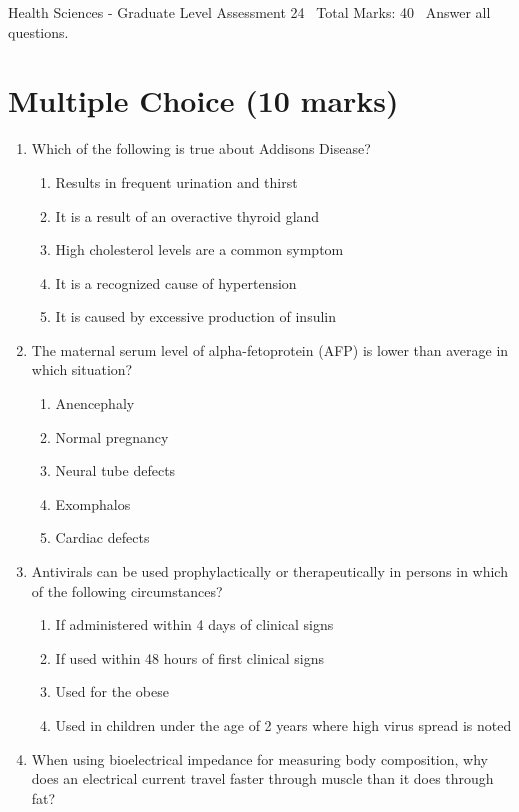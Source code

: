 \documentclass[12pt]{article}
\begin{document}
\begin{center}
Health Sciences - Graduate Level Assessment 24 \
Total Marks: 40 \
Answer all questions.
\end{center}

\section*{Multiple Choice (10 marks)}
\begin{enumerate}[label=\arabic*.]
\item Which of the following is true about Addisons Disease?
\begin{enumerate}[label=(\alph*)]
    \item Results in frequent urination and thirst
    \item It is a result of an overactive thyroid gland
    \item High cholesterol levels are a common symptom
    \item It is a recognized cause of hypertension
    \item It is caused by excessive production of insulin
\end{enumerate}
\item The maternal serum level of alpha-fetoprotein (AFP) is lower than average in which situation?
\begin{enumerate}[label=(\alph*)]
    \item Anencephaly
    \item Normal pregnancy
    \item Neural tube defects
    \item Exomphalos
    \item Cardiac defects
\end{enumerate}
\item Antivirals can be used prophylactically or therapeutically in persons in which of the following circumstances?
\begin{enumerate}[label=(\alph*)]
    \item If administered within 4 days of clinical signs
    \item If used within 48 hours of first clinical signs
    \item Used for the obese
    \item Used in children under the age of 2 years where high virus spread is noted
\end{enumerate}
\item When using bioelectrical impedance for measuring body composition, why does an electrical current travel faster through muscle than it does through fat?

\end{enumerate}
\end{document}
